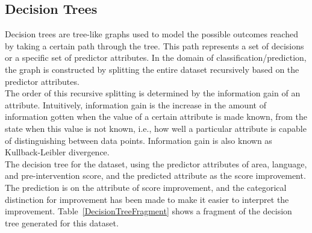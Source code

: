 \documentclass[10pt]{article}
\begin{document}
\subsection{Decision Trees}
\label{sec:DecisionTrees}
Decision trees are tree-like graphs used to model the possible outcomes reached by taking a certain path through the tree. This path represents a set of decisions or a specific set of predictor attributes. In the domain of classification/prediction, the graph is constructed by splitting the entire dataset recursively based on the predictor attributes.\\
The order of this recursive splitting is determined by the information gain of an attribute. Intuitively, information gain is the increase in the amount of information gotten when the value of a certain attribute is made known, from the state when this value is not known, i.e., how well a particular attribute is capable of distinguishing between data points. Information gain is also known as Kullback-Leibler divergence.\\
The decision tree for the dataset, using the predictor attributes of area, language, and pre-intervention score, and the predicted attribute as the score improvement.\\
The prediction is on the attribute of score improvement, and the categorical distinction for improvement has been made to make it easier to interpret the improvement. Table~\ref{DecisionTreeFragment} shows a fragment of the decision tree generated for this dataset.
\end{document}
